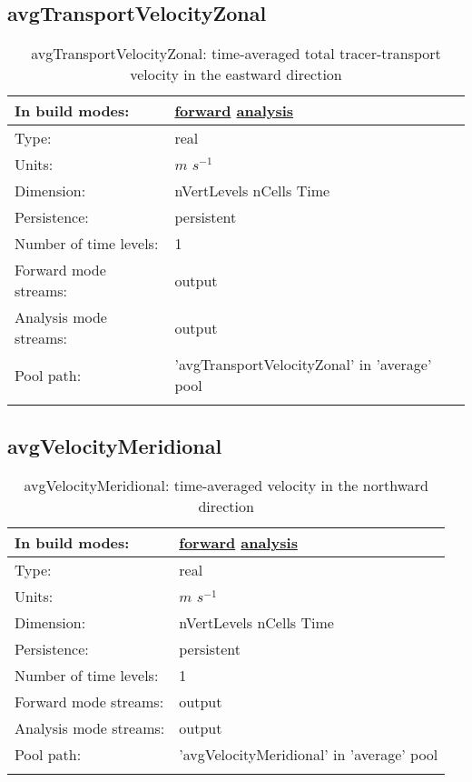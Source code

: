 \subsection[avgTransportVelocityZonal]{avgTransportVelocityZonal}
\label{subsec:var_sec_average_avgTransportVelocityZonal}
\begin{center}
\begin{longtable}{| p{2.0in} | p{4.0in} |}
        \hline 
        In build modes: & \hyperref[subsec:forward_var_tab_average]{forward} \hyperref[subsec:analysis_var_tab_average]{analysis} \\
        \hline 
        Type: & real \\
        \hline 
        Units: & $m$ $s^{-1}$ \\
        \hline 
        Dimension: & nVertLevels nCells Time \\
        \hline 
        Persistence: & persistent \\
        \hline 
        Number of time levels: & 1 \\
        \hline 
		 Forward mode streams: &  output \\
        \hline 
		 Analysis mode streams: &  output \\
        \hline 
            Pool path: & 'avgTransportVelocityZonal' in 'average' pool
 \\
		 \hline 
    \caption{avgTransportVelocityZonal: time-averaged total tracer-transport velocity in the eastward direction}
\end{longtable}
\end{center}
\subsection[avgVelocityMeridional]{avgVelocityMeridional}
\label{subsec:var_sec_average_avgVelocityMeridional}
\begin{center}
\begin{longtable}{| p{2.0in} | p{4.0in} |}
        \hline 
        In build modes: & \hyperref[subsec:forward_var_tab_average]{forward} \hyperref[subsec:analysis_var_tab_average]{analysis} \\
        \hline 
        Type: & real \\
        \hline 
        Units: & $m$ $s^{-1}$ \\
        \hline 
        Dimension: & nVertLevels nCells Time \\
        \hline 
        Persistence: & persistent \\
        \hline 
        Number of time levels: & 1 \\
        \hline 
		 Forward mode streams: &  output \\
        \hline 
		 Analysis mode streams: &  output \\
        \hline 
            Pool path: & 'avgVelocityMeridional' in 'average' pool
 \\
		 \hline 
    \caption{avgVelocityMeridional: time-averaged velocity in the northward direction}
\end{longtable}
\end{center}
